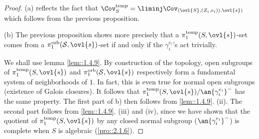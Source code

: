 \begin{proof}
  (a) reflects the fact that $\Cov_S^{\mathrm{temp}}= \liminj
 \Cov_{(\ovl{S},(Z_i,e_i)),\ovl{s})}$ which follows from the previous
 proposition.

  (b) The previous proposition shows more precisely that a
 $\pi_1^{\mathrm{temp}}(S,\ovl{s})$-set comes from a 
 $\pi_1^{\mathrm{orb}}(\mathcal{S},\ovl{s})$-set if and only if the
 $\gamma_i^{e_i}$'s act trivially. 
 
 \noindent We shall use lemma \ref{lem::1.4.9}. By construction
 of the topology, open subgroups of
 $\pi_1^{\mathrm{temp}}(S,\ovl{s})$ and
 $\pi_1^{\mathrm{orb}}(\mathcal{S},\ovl{s})$ respectively form a fundamental
 system of neighborhoods of 
 $1$. In fact, this is even true for normal open subgroups
 (existence of Galois closures). It follows that 
 $\pi_1^{\mathrm{temp}}(S,\ovl{s})/\an{\gamma_i^{e_i}}^-$ has the same
 property. The first part of b) then follows from
 \ref{lem::1.4.9}. (ii). The 
 second part follows from \ref{lem::1.4.9}. (iii) and (iv), since
 we have 
 shown that the quotient of $\pi_1^{\mathrm{temp}}(S,\ovl{s})$ by
 any closed normal subgroup (\eg $\an{\gamma_i^{e_i}}^-$) is
 complete when $S$ is algebraic (\ref{pro::2.1.6}).
\end{proof}

